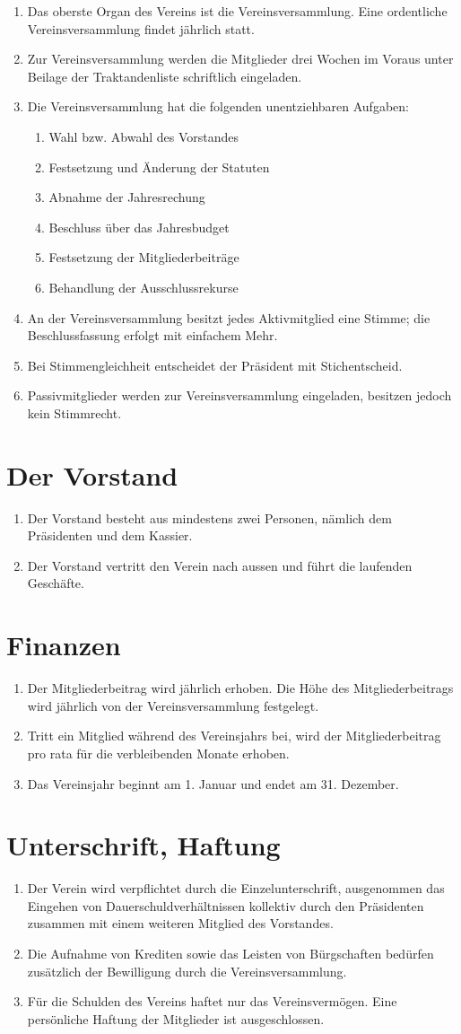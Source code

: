 \documentclass[10pt,a4paper,parskip,fleqn]{scrartcl}
\newcommand{\ol}{\begin{enumerate}[itemsep=-0.2em,topsep=-0.2em]}
\newcommand{\lo}{\end{enumerate}}
\newcommand{\li}{\item}
\begin{document}
\ol
	\li Das oberste Organ des Vereins ist die Vereinsversammlung. Eine ordentliche
	Vereinsversammlung findet jährlich statt.
	\li Zur Vereinsversammlung werden die Mitglieder drei Wochen im Voraus
	unter Beilage der Traktandenliste schriftlich eingeladen.
	\li Die Vereinsversammlung hat die folgenden unentziehbaren Aufgaben:
		\ol
			\li Wahl bzw. Abwahl des Vorstandes
			\li Festsetzung und Änderung der Statuten
			\li Abnahme der Jahresrechung
			\li Beschluss über das Jahresbudget
			\li Festsetzung der Mitgliederbeiträge
			\li Behandlung der Ausschlussrekurse
		\lo
	\li An der Vereinsversammlung besitzt jedes Aktivmitglied eine Stimme; die
	Beschlussfassung erfolgt mit einfachem Mehr.
	\li Bei Stimmengleichheit entscheidet der Präsident mit Stichentscheid.
	\li Passivmitglieder werden zur Vereinsversammlung eingeladen, besitzen jedoch
	kein Stimmrecht.
\lo


\section{Der Vorstand}

\ol
	\li Der Vorstand besteht aus mindestens zwei Personen, nämlich dem Präsidenten
	und dem Kassier.
	\li Der Vorstand vertritt den Verein nach aussen und führt die laufenden
	Geschäfte.
\lo


\section{Finanzen}

\ol
	\li Der Mitgliederbeitrag wird jährlich erhoben. Die Höhe des
	Mitgliederbeitrags wird jährlich von der Vereinsversammlung festgelegt.
	\li Tritt ein Mitglied während des Vereinsjahrs bei, wird der
	Mitgliederbeitrag pro rata für die verbleibenden Monate erhoben.
	\li Das Vereinsjahr beginnt am 1. Januar und endet am 31. Dezember.
\lo


\section{Unterschrift, Haftung}

\ol
	\li Der Verein wird verpflichtet durch die Einzelunterschrift, ausgenommen das
	Eingehen von Dauerschuldverhältnissen kollektiv durch den Präsidenten zusammen
	mit einem weiteren Mitglied des Vorstandes.
	\li Die Aufnahme von Krediten sowie das Leisten von Bürgschaften bedürfen
	zusätzlich der Bewilligung durch die Vereinsversammlung.
	\li Für die Schulden des Vereins haftet nur das Vereinsvermögen. Eine
	persönliche Haftung der Mitglieder ist ausgeschlossen.
\lo
\end{document}
